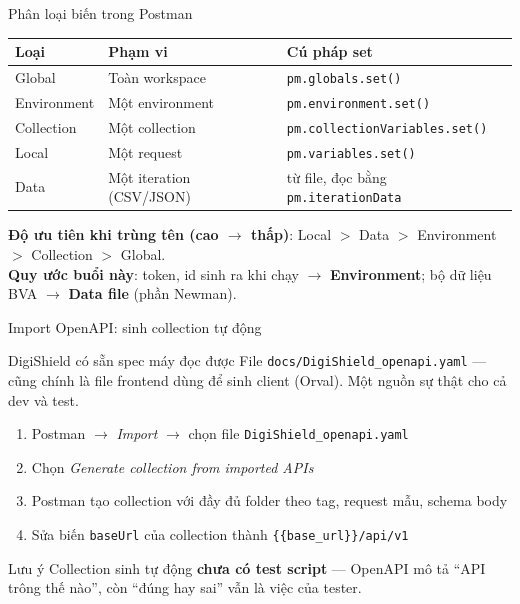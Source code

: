 \documentclass[aspectratio=169,12pt]{beamer}
\begin{document}
\begin{frame}[fragile]{Phân loại biến trong Postman}
  \begin{center}
  \small
  \setlength{\tabcolsep}{4pt}
  \begin{tabular}{llp{5cm}}
    \toprule
    \textbf{Loại} & \textbf{Phạm vi} & \textbf{Cú pháp set} \\
    \midrule
    Global      & Toàn workspace  & \texttt{pm.globals.set()} \\
    Environment & Một environment & \texttt{pm.environment.set()} \\
    Collection  & Một collection  & \texttt{pm.\allowbreak collectionVariables.\allowbreak set()} \\
    Local       & Một request     & \texttt{pm.variables.set()} \\
    Data        & Một iteration (CSV/JSON) & từ file, đọc bằng \texttt{pm.iterationData} \\
    \bottomrule
  \end{tabular}
  \end{center}

  {\small \textbf{Độ ưu tiên khi trùng tên (cao $\to$ thấp)}:
  Local \(>\) Data \(>\) Environment \(>\) Collection \(>\) Global.\\[0.25em]
  \textbf{Quy ước buổi này}: token, id sinh ra khi chạy $\to$
  \textbf{Environment}; bộ dữ liệu BVA $\to$ \textbf{Data file} (phần Newman).}
\end{frame}

\begin{frame}{Import OpenAPI: sinh collection tự động}
  \begin{block}{DigiShield có sẵn spec máy đọc được}
    File \texttt{docs/DigiShield\_openapi.yaml} --- cũng chính là file
    frontend dùng để sinh client (Orval). Một nguồn sự thật cho cả dev và test.
  \end{block}

  \begin{enumerate}
    \item Postman $\to$ \emph{Import} $\to$ chọn file
      \texttt{DigiShield\_openapi.yaml}
    \item Chọn \emph{Generate collection from imported APIs}
    \item Postman tạo collection với đầy đủ folder theo tag,
      request mẫu, schema body
    \item Sửa biến \texttt{baseUrl} của collection thành
      \texttt{\{\{base\_url\}\}/api/v1}
  \end{enumerate}

  \begin{alertblock}{Lưu ý}
    Collection sinh tự động \textbf{chưa có test script} --- OpenAPI mô tả
    ``API trông thế nào'', còn ``đúng hay sai'' vẫn là việc của tester.
  \end{alertblock}
\end{frame}
\end{document}
